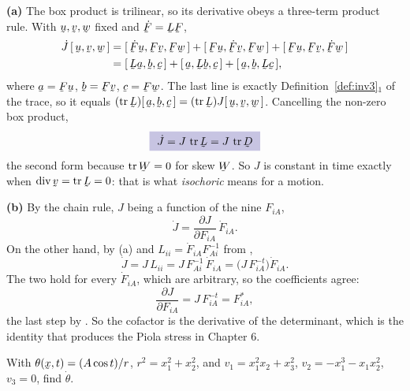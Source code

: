 \begin{solution}
\textbf{(a)} The box product is trilinear, so its derivative obeys a
three-term product rule. With $\bu,\bv,\bw$ fixed and $\dot\bF=\bL\bF$,
\[
\begin{aligned}
   \dot J\,\tbox\bu\bv\bw
   &=\tbox{\dot\bF\bu}{\bF\bv}{\bF\bw}
    +\tbox{\bF\bu}{\dot\bF\bv}{\bF\bw}
    +\tbox{\bF\bu}{\bF\bv}{\dot\bF\bw}\\
   &=\tbox{\bL\ba}{\bb}{\bc}+\tbox{\ba}{\bL\bb}{\bc}
    +\tbox{\ba}{\bb}{\bL\bc},
\end{aligned}
\]
where $\ba=\bF\bu$, $\bb=\bF\bv$, $\bc=\bF\bw$. The last line is exactly
Definition~\ref{def:inv3}$_{1}$ of the trace, so it equals
$(\tr\bL)\tbox\ba\bb\bc=(\tr\bL)J\tbox\bu\bv\bw$. Cancelling the non-zero
box product,
\[
   \boxed{\ \dot J=J\,\tr\bL=J\,\tr\bD\ }
\]
the second form because $\tr\bW=0$ for skew $\bW$. So $J$ is constant in
time exactly when $\dvg\bv=\tr\bL=0$: that is what \emph{isochoric} means
for a motion.

\textbf{(b)} By the chain rule, $J$ being a function of the nine $F_{iA}$,
\[
   \dot J=\frac{\partial J}{\partial F_{iA}}\,\dot F_{iA}.
\]
On the other hand, by (a) and $L_{ii}=\dot F_{iA}F^{-1}_{Ai}$ from
,
\[
   \dot J=J\,L_{ii}=J\,F^{-1}_{Ai}\,\dot F_{iA}
   =\big(J\,F^{-t}_{iA}\big)\dot F_{iA}.
\]
The two hold for every $\dot F_{iA}$, which are arbitrary, so the
coefficients agree:
\[
   \frac{\partial J}{\partial F_{iA}}=J\,F^{-t}_{iA}=F^{*}_{iA},
\]
the last step by . So the cofactor is the derivative of the
determinant, which is the identity that produces the Piola stress in
Chapter 6.
\end{solution}

\begin{problem}
With $\theta(\bx,t)=(A\cos t)/r$, $r^{2}=x_{1}^{2}+x_{2}^{2}$, and
$v_{1}=x_{1}^{2}x_{2}+x_{3}^{2}$, $v_{2}=-x_{1}^{3}-x_{1}x_{2}^{2}$,
$v_{3}=0$, find $\dot\theta$.
\end{problem}

